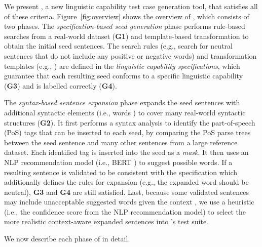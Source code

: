 We present \tool{}, a new linguistic capability test case generation
tool, that satisfies all of these criteria.  
Figure~\ref{fig:overview} shows the overview of \tool{}, which
consists of two phases.  The \emph{specification-based seed
  generation} phase performs rule-based searches from a real-world
dataset ({\bf G1}) and template-based transformation to obtain the
initial seed sentences.  The search rules (e.g., search for neutral
sentences that do not include any positive or negative words) and
transformation templates (e.g.,  ) are defined in the \emph{linguistic capability
  specifications}, which guarantee that each resulting seed conforms
to a specific linguistic capability ({\bf G3}) and is labelled
correctly ({\bf G4}).

The \emph{syntax-based sentence expansion} phase expands the seed
sentences with additional syntactic elements (i.e., words
) to cover many real-world
syntactic structures ({\bf G2}). It first performs a syntax analysis
to identify the part-of-speech (PoS) tags that can be inserted to each
seed, by comparing the PoS parse trees between the seed sentence and
many other sentences from a large reference dataset. Each identified
tag is inserted into the seed as a \emph{mask}. It then uses an NLP
recommendation model (i.e., BERT \cite{}) to suggest possible
words. If a resulting sentence is validated to be consistent with the
specification which additionally defines the rules for expansion
(e.g., the expanded word should be neutral), {\bf G3} and {\bf G4} are
still satisfied.  Last, because some validated sentences may include
unacceptable suggested words given the context  , we use a heuristic (i.e., the
confidence score from the NLP recommendation model) to select the more
realistic context-aware expanded sentences into \tool{}'s test suite.

We now describe each phase of \tool{} in detail.


